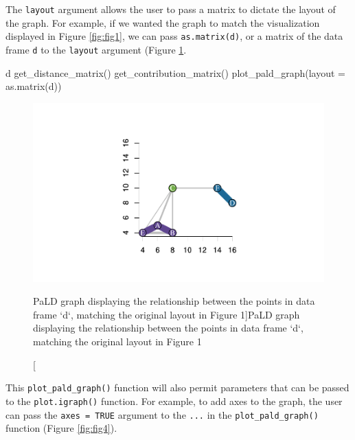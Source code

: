 The \texttt{layout} argument allows the user to pass a matrix to dictate
the layout of the graph. For example, if we wanted the graph to match
the visualization displayed in Figure \ref{fig:fig1}, we can pass
\texttt{as.matrix(d)}, or a matrix of the data frame \texttt{d} to the
\texttt{layout} argument (Figure \ref{fig:fig3}.

\begin{Schunk}
\begin{Sinput}
d %
  get_distance_matrix() %
  get_contribution_matrix() %
  plot_pald_graph(layout = as.matrix(d))
\end{Sinput}
\begin{figure}
\includegraphics{manuscript_files/figure-latex/fig3-1} \caption[PaLD graph displaying the relationship between the points in data frame `d`, matching the original layout in Figure 1]{PaLD graph displaying the relationship between the points in data frame `d`, matching the original layout in Figure 1}\label{fig:fig3}
\end{figure}
\end{Schunk}

This \texttt{plot\_pald\_graph()} function will also permit parameters
that can be passed to the \texttt{plot.igraph()} function. For example,
to add axes to the graph, the user can pass the \texttt{axes\ =\ TRUE}
argument to the \texttt{...} in the \texttt{plot\_pald\_graph()}
function (Figure \ref{fig:fig4}).

